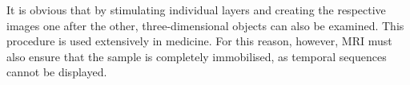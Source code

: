 It is obvious that by stimulating individual layers and creating the respective images one after the other, three-dimensional objects can also be examined.
This procedure is used extensively in medicine.
For this reason, however, MRI must also ensure that the sample is completely immobilised, as temporal sequences cannot be displayed.
